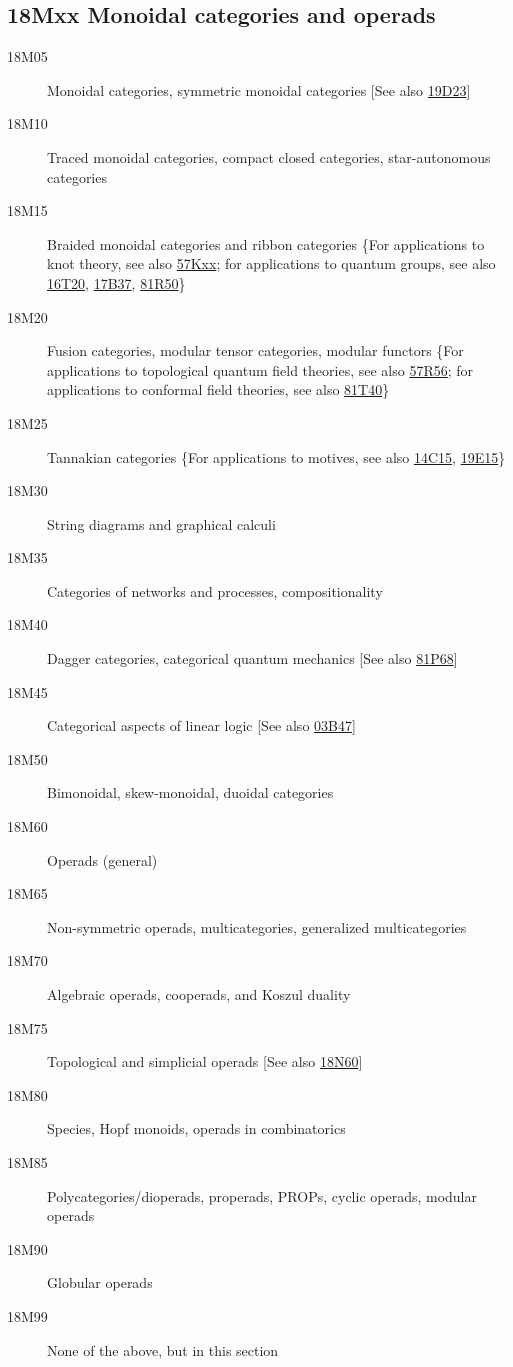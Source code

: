 \subsection*{18Mxx Monoidal categories and operads}\label{18Mxx}
\begin{description} 
\item [18M05]\label{18M05} Monoidal categories, symmetric monoidal categories [See also \hyperref[19D23]{19D23}]
\item [18M10]\label{18M10} Traced monoidal categories, compact closed categories, star-autonomous categories 
\item [18M15]\label{18M15} Braided monoidal categories and ribbon categories \{For applications to knot theory, see also \hyperref[57Kxx]{57Kxx}; for applications to quantum groups, see also \hyperref[16T20]{16T20}, \hyperref[17B37]{17B37}, \hyperref[81R50]{81R50}\}
\item [18M20]\label{18M20} Fusion categories, modular tensor categories, modular functors \{For applications to topological quantum field theories, see also \hyperref[57R56]{57R56}; for applications to conformal field theories, see also \hyperref[81T40]{81T40}\}
\item [18M25]\label{18M25} Tannakian categories \{For applications to motives, see also \hyperref[14C15]{14C15}, \hyperref[19E15]{19E15}\}
\item [18M30]\label{18M30} String diagrams and graphical calculi
\item [18M35]\label{18M35} Categories of networks and processes, compositionality
\item [18M40]\label{18M40} Dagger categories, categorical quantum mechanics [See also \hyperref[81P68]{81P68}]
\item [18M45]\label{18M45} Categorical aspects of linear logic [See also \hyperref[03B47]{03B47}]
\item [18M50]\label{18M50} Bimonoidal, skew-monoidal, duoidal categories
\item [18M60]\label{18M60} Operads (general)
\item [18M65]\label{18M65} Non-symmetric operads, multicategories, generalized multicategories
\item [18M70]\label{18M70} Algebraic operads, cooperads, and Koszul duality
\item [18M75]\label{18M75} Topological and simplicial operads [See also \hyperref[18N60]{18N60}]
\item [18M80]\label{18M80} Species, Hopf monoids, operads in combinatorics
\item [18M85]\label{18M85} Polycategories/dioperads, properads, PROPs, cyclic operads, modular operads
\item [18M90]\label{18M90} Globular operads
\item [18M99]\label{18M99} None of the above, but in this section
\end{description}
